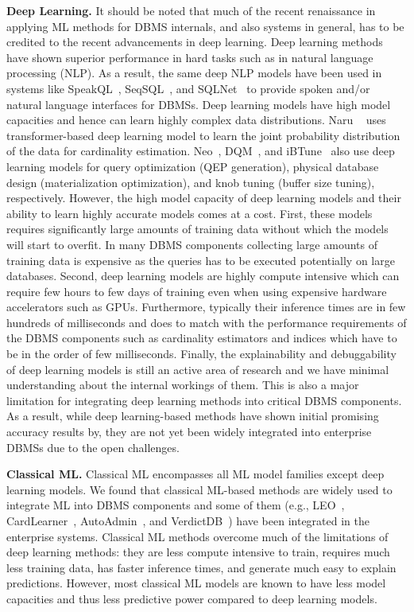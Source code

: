\vspace{2mm}
\noindent \textbf{Deep Learning.} It should be noted that much of the recent renaissance in applying ML methods for DBMS internals, and also systems in general, has to be credited to the recent advancements in deep learning.
Deep learning methods have shown superior performance in hard tasks such as in natural language processing (NLP).
As a result, the same deep NLP models have been used in systems like SpeakQL~\cite{speakql}, SeqSQL~\cite{seq2sql}, and SQLNet~\cite{sqlnet} to provide spoken and/or natural language interfaces for DBMSs.
Deep learning models have high model capacities and hence can learn highly complex data distributions.
Naru ~\cite{naru} uses transformer-based deep learning model to learn the joint probability distribution of the data for cardinality estimation.
Neo~\cite{neo}, DQM~\cite{dqm}, and iBTune~\cite{ibtune} also use deep learning models for query optimization (QEP generation), physical database design (materialization optimization), and knob tuning (buffer size tuning), respectively.
However, the high model capacity of deep learning models and their ability to learn highly accurate models comes at a cost.
First, these models requires significantly large amounts of training data without which the models will start to overfit. In many DBMS components collecting large amounts of training data is expensive as the queries has to be executed potentially on large databases.
Second, deep learning models are highly compute intensive which can require few hours to few days of training even when using expensive hardware accelerators such as GPUs.
Furthermore, typically their inference times are in few hundreds of milliseconds and does to match with the performance requirements of the DBMS components such as cardinality estimators and indices which have to be in the order of few milliseconds.
Finally, the explainability and debuggability of deep learning models is still an active area of research and we have minimal understanding about the internal workings of them.
This is also a major limitation for integrating deep learning methods into critical DBMS components.
As a result, while deep learning-based methods have shown initial promising accuracy results by, they are not yet been widely integrated into enterprise DBMSs due to the open challenges.


\vspace{2mm}
\noindent \textbf{Classical ML.} Classical ML encompasses all ML model families except deep learning models.
We found that classical ML-based methods are widely used to integrate ML into DBMS components and some of them (e.g., LEO~\cite{leo}, CardLearner~\cite{cardlearner}, AutoAdmin~\cite{autoadmin}, and VerdictDB~\cite{verdict}) have been integrated in the enterprise systems.
Classical ML methods overcome much of the limitations of deep learning methods: they are less compute intensive to train, requires much less training data, has faster inference times, and generate much easy to explain predictions.
However, most classical ML models are known to have less model capacities and thus less predictive power compared to deep learning models.

